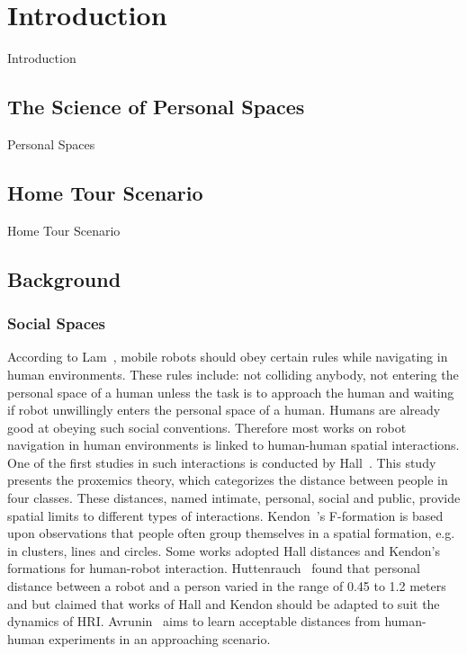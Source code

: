 \chapter{Introduction}
\label{chapter:introduction}
Introduction

\section{The Science of Personal Spaces}
\label{sec:personal_spaces}

Personal Spaces

\section{Home Tour Scenario}
\label{sec:home_tour_scenario}

Home Tour Scenario

\section{Background}

\subsection{Social Spaces}

According to Lam~\cite{lam2011human}, mobile robots should obey certain rules while navigating in human environments. These rules include: not colliding anybody, not entering the personal space of a human unless the task is to approach the human and waiting if robot unwillingly enters the personal space of a human. Humans are already good at obeying such social conventions. Therefore most works on robot navigation in human environments is linked to human-human spatial interactions. One of the first studies in such interactions is conducted by Hall~\cite{hall1969hidden}. This study presents the proxemics theory, which categorizes the distance between people in four classes. These distances, named intimate, personal, social and public, provide spatial limits to different types of interactions. Kendon~\cite{kendon1990conducting}'s F-formation is based upon observations that people often group themselves in a spatial formation, e.g. in clusters, lines and circles. Some works adopted Hall distances and Kendon's formations for human-robot interaction. Huttenrauch~\cite{huttenrauch2006investigating} found that personal distance between a robot and a person varied in the range of 0.45 to 1.2 meters and but claimed that works of Hall and Kendon should be adapted to suit the dynamics of HRI. Avrunin~\cite{avrunin2013using} aims to learn acceptable distances from human-human experiments in an approaching scenario. 


